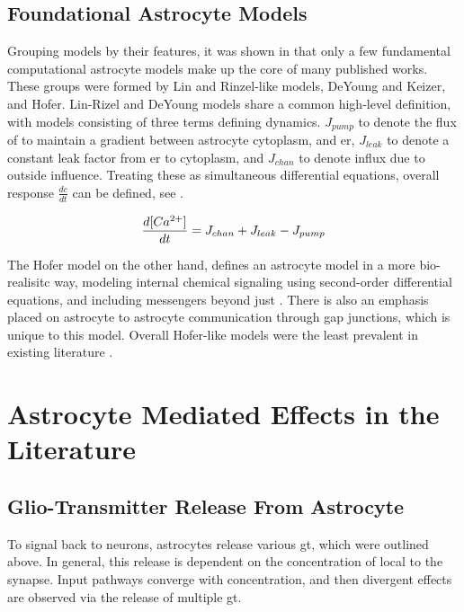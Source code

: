     \subsection{Foundational Astrocyte Models}
    Grouping models by their features, it was shown in \parencite{manninen_2018}
    that only a few fundamental computational astrocyte models make up the core
    of many published works. These groups were formed by Lin and Rinzel-like
    models, DeYoung and Keizer, and Hofer. Lin-Rizel and DeYoung models share a
    common high-level definition, with models consisting of three terms defining
    \ca dynamics. $J_{pump}$ to denote the flux of \ca to maintain a gradient
    between astrocyte cytoplasm, and \gls{er}, $J_{leak}$ to denote a constant
    leak factor from \gls{er} to cytoplasm, and $J_{chan}$ to denote \ca influx
    due to outside influence. Treating these as simultaneous differential
    equations, overall \ca response $\frac{dc}{dt}$ can be defined, see
    .

    \begin{align}
      \frac{d[Ca^{2+}]}{dt} = J_{chan} + J_{leak} -
      J_{pump} \label{eq:lr_dk_astro} \\
    \end{align}

    The Hofer model on the other hand, defines an astrocyte model in a more bio-realisitc
    way, modeling internal chemical signaling using second-order differential
    equations, and including messengers beyond just \ipt. There is also an
    emphasis placed on astrocyte to astrocyte communication through gap
    junctions, which is unique to this model. Overall Hofer-like models were the
    least prevalent in existing literature \parencite{manninen_2018}.

    
    \section{Astrocyte Mediated Effects in the Literature}
    \subsection{Glio-Transmitter Release From Astrocyte}
    To signal back to neurons, astrocytes release various \gls{gt},
    which were outlined above. In general, this release is dependent on the
    concentration of \ca local to the synapse. Input pathways converge with
    \ca concentration, and then divergent effects are observed via the release
    of multiple \gls{gt}.

